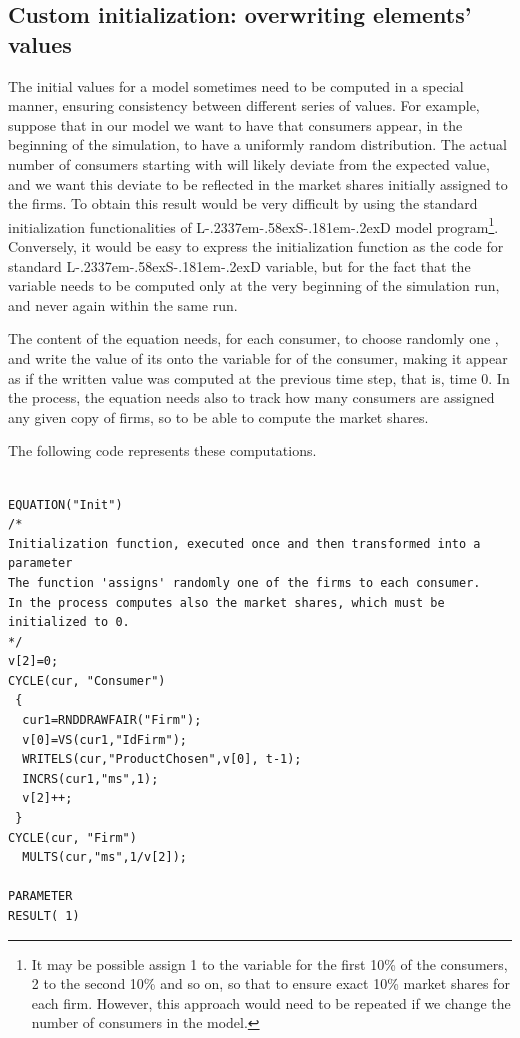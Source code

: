 \documentclass [11pt,a4paper] {book}
\def\LsD{{L\kern-.2337em\lower-.58ex\hbox{S}\kern-.181em\lower-.2ex\hbox{D}}\xspace}
\begin{document}
\subsection{Custom initialization: overwriting elements' values}

The initial values for a model sometimes need to be computed in a special manner, ensuring consistency between different series of values. For example, suppose that in our model we want to have that consumers appear, in the beginning of the simulation, to have a uniformly random distribution. The actual number of consumers starting with  will likely deviate from the expected value, and we want this deviate to be reflected in the market shares initially assigned to the firms. To obtain this result would be very difficult by using the standard initialization functionalities of \LsD model program\footnote{It may be possible assign 1 to the variable  for the first 10\% of the consumers, 2 to the second 10\% and so on, so that to ensure exact 10\% market shares for each firm. However, this approach would need to be repeated if we change the number of consumers in the model.}. Conversely, it would be easy to express the initialization function as the code for standard \LsD variable, but for the fact that the variable needs to be computed only at the very beginning of the simulation run, and never again within the same run.

The content of the equation needs, for each consumer, to choose randomly one , and write the value of its  onto the variable for  of the consumer, making it appear as if the written value was computed at the previous time step, that is, time 0. In the process, the equation needs also to track how many consumers are assigned any given copy of firms, so to be able to compute the market shares. 

The following code represents these computations.

\begin{minipage}[h]{10cm}
\small
\begin{verbatim}

EQUATION("Init")
/*
Initialization function, executed once and then transformed into a parameter
The function 'assigns' randomly one of the firms to each consumer.
In the process computes also the market shares, which must be initialized to 0.
*/
v[2]=0;
CYCLE(cur, "Consumer")
 {
  cur1=RNDDRAWFAIR("Firm");
  v[0]=VS(cur1,"IdFirm");
  WRITELS(cur,"ProductChosen",v[0], t-1);
  INCRS(cur1,"ms",1);
  v[2]++;
 }
CYCLE(cur, "Firm")
  MULTS(cur,"ms",1/v[2]);
  
PARAMETER
RESULT( 1)

\end{verbatim}
\normalsize
\end{minipage}
\end{document}
